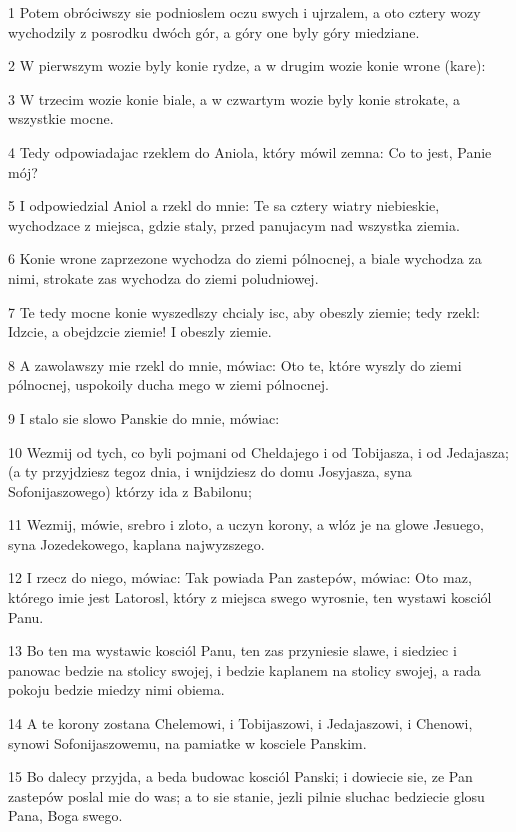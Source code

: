\par 1 Potem obróciwszy sie podnioslem oczu swych i ujrzalem, a oto cztery wozy wychodzily z posrodku dwóch gór, a góry one byly góry miedziane.
\par 2 W pierwszym wozie byly konie rydze, a w drugim wozie konie wrone (kare):
\par 3 W trzecim wozie konie biale, a w czwartym wozie byly konie strokate, a wszystkie mocne.
\par 4 Tedy odpowiadajac rzeklem do Aniola, który mówil zemna: Co to jest, Panie mój?
\par 5 I odpowiedzial Aniol a rzekl do mnie: Te sa cztery wiatry niebieskie, wychodzace z miejsca, gdzie staly, przed panujacym nad wszystka ziemia.
\par 6 Konie wrone zaprzezone wychodza do ziemi pólnocnej, a biale wychodza za nimi, strokate zas wychodza do ziemi poludniowej.
\par 7 Te tedy mocne konie wyszedlszy chcialy isc, aby obeszly ziemie; tedy rzekl: Idzcie, a obejdzcie ziemie! I obeszly ziemie.
\par 8 A zawolawszy mie rzekl do mnie, mówiac: Oto te, które wyszly do ziemi pólnocnej, uspokoily ducha mego w ziemi pólnocnej.
\par 9 I stalo sie slowo Panskie do mnie, mówiac:
\par 10 Wezmij od tych, co byli pojmani od Cheldajego i od Tobijasza, i od Jedajasza; (a ty przyjdziesz tegoz dnia, i wnijdziesz do domu Josyjasza, syna Sofonijaszowego) którzy ida z Babilonu;
\par 11 Wezmij, mówie, srebro i zloto, a uczyn korony, a wlóz je na glowe Jesuego, syna Jozedekowego, kaplana najwyzszego.
\par 12 I rzecz do niego, mówiac: Tak powiada Pan zastepów, mówiac: Oto maz, którego imie jest Latorosl, który z miejsca swego wyrosnie, ten wystawi kosciól Panu.
\par 13 Bo ten ma wystawic kosciól Panu, ten zas przyniesie slawe, i siedziec i panowac bedzie na stolicy swojej, i bedzie kaplanem na stolicy swojej, a rada pokoju bedzie miedzy nimi obiema.
\par 14 A te korony zostana Chelemowi, i Tobijaszowi, i Jedajaszowi, i Chenowi, synowi Sofonijaszowemu, na pamiatke w kosciele Panskim.
\par 15 Bo dalecy przyjda, a beda budowac kosciól Panski; i dowiecie sie, ze Pan zastepów poslal mie do was; a to sie stanie, jezli pilnie sluchac bedziecie glosu Pana, Boga swego.

